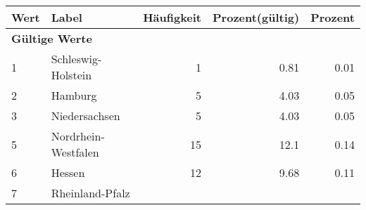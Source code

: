      \begin{longtable}{lXrrr}
     \toprule
     \textbf{Wert} & \textbf{Label} & \textbf{Häufigkeit} & \textbf{Prozent(gültig)} & \textbf{Prozent} \\
     \endhead
     \midrule
     \multicolumn{5}{l}{\textbf{Gültige Werte}}\\

     1 &
     \multicolumn{1}{X}{ Schleswig-Holstein   } &


       \num{1} &
       \num[round-mode=places,round-precision=2]{0,81} &
         \num[round-mode=places,round-precision=2]{0,01} \\

     2 &
     \multicolumn{1}{X}{ Hamburg   } &


       \num{5} &
       \num[round-mode=places,round-precision=2]{4,03} &
         \num[round-mode=places,round-precision=2]{0,05} \\

     3 &
     \multicolumn{1}{X}{ Niedersachsen   } &


       \num{5} &
       \num[round-mode=places,round-precision=2]{4,03} &
         \num[round-mode=places,round-precision=2]{0,05} \\

     5 &
     \multicolumn{1}{X}{ Nordrhein-Westfalen   } &


       \num{15} &
       \num[round-mode=places,round-precision=2]{12,1} &
         \num[round-mode=places,round-precision=2]{0,14} \\

     6 &
     \multicolumn{1}{X}{ Hessen   } &


       \num{12} &
       \num[round-mode=places,round-precision=2]{9,68} &
         \num[round-mode=places,round-precision=2]{0,11} \\

     7 &
     \multicolumn{1}{X}{ Rheinland-Pfalz   } &



\end{longtable}
